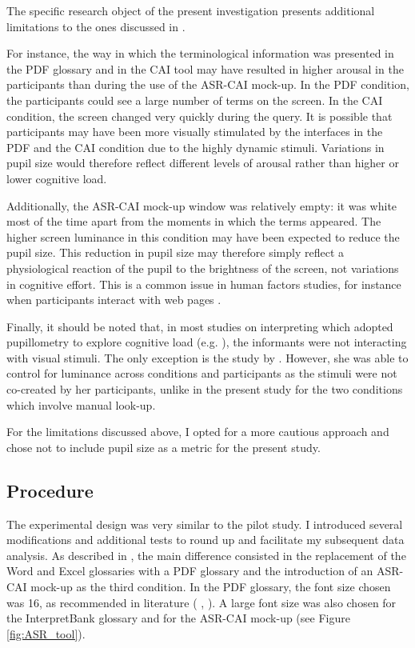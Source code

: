 The specific research object of the present investigation presents additional limitations to the ones discussed in .

For instance, the way in which the terminological information was presented in the PDF glossary and in the CAI tool may have resulted in higher arousal in the participants than during the use of the ASR-CAI mock-up. In the PDF condition, the participants could see a large number of terms on the screen. In the CAI condition, the screen changed very quickly during the query. It is possible that participants may have been more visually stimulated by the interfaces in the PDF and the CAI condition due to the highly dynamic stimuli. Variations in pupil size would therefore reflect different levels of arousal rather than higher or lower cognitive load.

\begin{sloppypar}
Additionally, the ASR-CAI mock-up window was relatively empty: it was white most of the time apart from the moments in which the terms appeared. The higher screen luminance in this condition may have been expected to reduce the pupil size. This reduction in pupil size may therefore simply reflect a physiological reaction of the pupil to the brightness of the screen, not variations in cognitive effort. This is a common issue in human factors studies, for instance when participants interact with web pages \citep[530]{holmqvist_eye_2011}.
\end{sloppypar}

Finally, it should be noted that, in most studies on interpreting which adopted pupillometry to explore cognitive load (e.g. \citealt{hyona_pupil_1995,seeber_cognitive_2012}), the informants were not interacting with visual stimuli. The only exception is the study by \citet{gieshoff_impact_2018}. However, she was able to control for luminance across conditions and participants as the stimuli were not co-created by her participants, unlike in the present study for the two conditions which involve manual look-up.

For the limitations discussed above, I opted for a more cautious approach and chose not to include pupil size as a metric for the present study.
\subsection{Procedure} \label{design_MS}
The experimental design was very similar to the pilot study. I introduced several modifications and additional tests to round up and facilitate my subsequent data analysis. As described in , the main difference consisted in the replacement of the Word and Excel glossaries with a PDF glossary and the introduction of an ASR-CAI mock-up as the third condition. In the PDF glossary, the font size chosen was 16, as recommended in literature (\citealt[e.g.][261,]{obrien_eye_2009} \citealt[20]{hvelplund_eye_2014}, \citealt[37]{conklin_eye-tracking_2018}). A large font size was also chosen for the InterpretBank glossary and for the ASR-CAI mock-up (see Figure \ref{fig:ASR_tool}).


